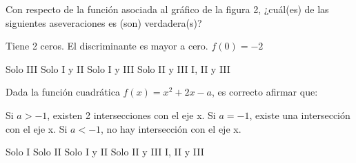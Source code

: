 \documentclass[sin nombre]{srs}
\begin{document}
\begin{preguntas}[after-item-skip=2cm]
\pregunta Con respecto de la función asociada al gráfico de la figura 2, ¿cuál(es) de las siguientes aseveraciones es (son) verdadera(s)?
\begin{centrado}
\end{centrado}
\begin{verticali}
\alternativa Tiene 2 ceros.
\alternativa El discriminante es mayor a cero.
\alternativa $f\left(0\right) = -2$
\end{verticali}
\begin{vertical}
\alternativa Solo III
\alternativa Solo I y II
\alternativa Solo I y III
\alternativa Solo II y III
\alternativa I, II y III
\end{vertical}

\pregunta Dada la función cuadrática $f\left(x\right) = x^2 + 2x - a$, es correcto afirmar que:
\begin{verticali}
\alternativa Si $a > -1$, existen 2 intersecciones con el eje x.
\alternativa Si $a = -1$, existe una intersección con el eje x.
\alternativa Si $a < -1$, no hay intersección con el eje x.
\end{verticali}
\begin{vertical}
\alternativa Solo I
\alternativa Solo II
\alternativa Solo I y II
\alternativa Solo II y III
\alternativa I, II y III
\end{vertical}


\end{preguntas}
\end{document}
